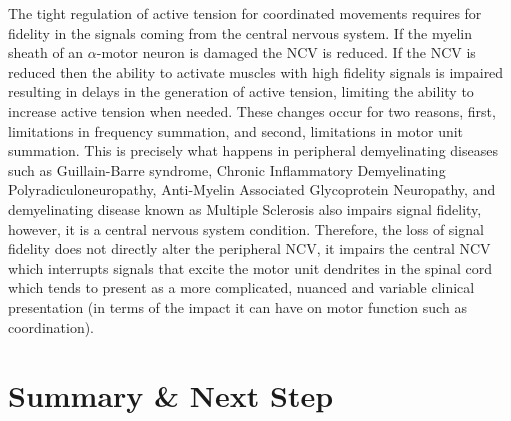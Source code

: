 The tight regulation of active tension for coordinated movements requires for fidelity in the signals coming from the central nervous system.\footnotemark{} If the myelin sheath of an $\alpha$-motor neuron is damaged the NCV is reduced. If the NCV is reduced then the ability to activate muscles with high fidelity signals is impaired resulting in delays in the generation of active tension, limiting the ability to increase active tension when needed. These changes occur for two reasons, first, limitations in frequency summation, and second, limitations in motor unit summation. This is precisely what happens in peripheral demyelinating diseases such as Guillain-Barre syndrome, Chronic Inflammatory Demyelinating Polyradiculoneuropathy, Anti-Myelin Associated Glycoprotein Neuropathy, and demyelinating disease known as Multiple Sclerosis also impairs signal fidelity, however, it is a central nervous system condition. Therefore, the loss of signal fidelity does not directly alter the peripheral NCV, it impairs the central NCV which interrupts signals that excite the motor unit dendrites in the spinal cord which tends to present as a more complicated, nuanced and variable clinical presentation (in terms of the impact it can have on motor function such as coordination).


\section{Summary \& Next Step}



\printbibliography[heading=subbibintoc]